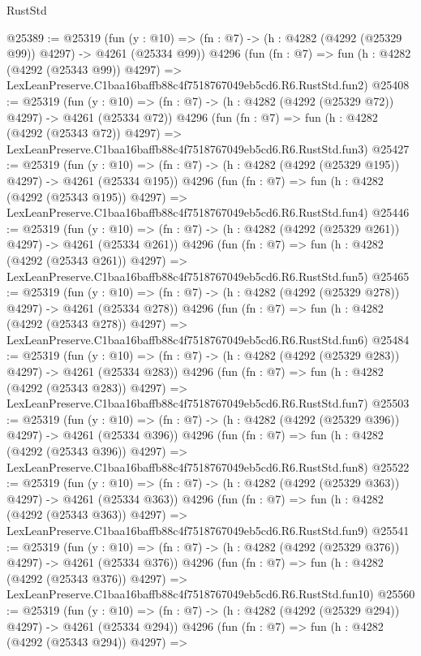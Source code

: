 \begin{lexlean}{RustStd}
\begin{coremodule}
@25389 := @25319
    (fun (y : @10) => (fn : @7) -> (h : @4282 (@4292 (@25329 @99)) @4297) -> @4261 (@25334 @99))
    @4296
    (fun (fn : @7) =>
    fun (h : @4282 (@4292 (@25343 @99)) @4297) =>
    LexLeanPreserve.C1baa16baffb88c4f7518767049eb5cd6.R6.RustStd.fun2)
@25408 := @25319
    (fun (y : @10) => (fn : @7) -> (h : @4282 (@4292 (@25329 @72)) @4297) -> @4261 (@25334 @72))
    @4296
    (fun (fn : @7) =>
    fun (h : @4282 (@4292 (@25343 @72)) @4297) =>
    LexLeanPreserve.C1baa16baffb88c4f7518767049eb5cd6.R6.RustStd.fun3)
@25427 := @25319
    (fun (y : @10) => (fn : @7) -> (h : @4282 (@4292 (@25329 @195)) @4297) -> @4261 (@25334 @195))
    @4296
    (fun (fn : @7) =>
    fun (h : @4282 (@4292 (@25343 @195)) @4297) =>
    LexLeanPreserve.C1baa16baffb88c4f7518767049eb5cd6.R6.RustStd.fun4)
@25446 := @25319
    (fun (y : @10) => (fn : @7) -> (h : @4282 (@4292 (@25329 @261)) @4297) -> @4261 (@25334 @261))
    @4296
    (fun (fn : @7) =>
    fun (h : @4282 (@4292 (@25343 @261)) @4297) =>
    LexLeanPreserve.C1baa16baffb88c4f7518767049eb5cd6.R6.RustStd.fun5)
@25465 := @25319
    (fun (y : @10) => (fn : @7) -> (h : @4282 (@4292 (@25329 @278)) @4297) -> @4261 (@25334 @278))
    @4296
    (fun (fn : @7) =>
    fun (h : @4282 (@4292 (@25343 @278)) @4297) =>
    LexLeanPreserve.C1baa16baffb88c4f7518767049eb5cd6.R6.RustStd.fun6)
@25484 := @25319
    (fun (y : @10) => (fn : @7) -> (h : @4282 (@4292 (@25329 @283)) @4297) -> @4261 (@25334 @283))
    @4296
    (fun (fn : @7) =>
    fun (h : @4282 (@4292 (@25343 @283)) @4297) =>
    LexLeanPreserve.C1baa16baffb88c4f7518767049eb5cd6.R6.RustStd.fun7)
@25503 := @25319
    (fun (y : @10) => (fn : @7) -> (h : @4282 (@4292 (@25329 @396)) @4297) -> @4261 (@25334 @396))
    @4296
    (fun (fn : @7) =>
    fun (h : @4282 (@4292 (@25343 @396)) @4297) =>
    LexLeanPreserve.C1baa16baffb88c4f7518767049eb5cd6.R6.RustStd.fun8)
@25522 := @25319
    (fun (y : @10) => (fn : @7) -> (h : @4282 (@4292 (@25329 @363)) @4297) -> @4261 (@25334 @363))
    @4296
    (fun (fn : @7) =>
    fun (h : @4282 (@4292 (@25343 @363)) @4297) =>
    LexLeanPreserve.C1baa16baffb88c4f7518767049eb5cd6.R6.RustStd.fun9)
@25541 := @25319
    (fun (y : @10) => (fn : @7) -> (h : @4282 (@4292 (@25329 @376)) @4297) -> @4261 (@25334 @376))
    @4296
    (fun (fn : @7) =>
    fun (h : @4282 (@4292 (@25343 @376)) @4297) =>
    LexLeanPreserve.C1baa16baffb88c4f7518767049eb5cd6.R6.RustStd.fun10)
@25560 := @25319
    (fun (y : @10) => (fn : @7) -> (h : @4282 (@4292 (@25329 @294)) @4297) -> @4261 (@25334 @294))
    @4296
    (fun (fn : @7) =>
    fun (h : @4282 (@4292 (@25343 @294)) @4297) =>

\end{coremodule}
\end{lexlean}
